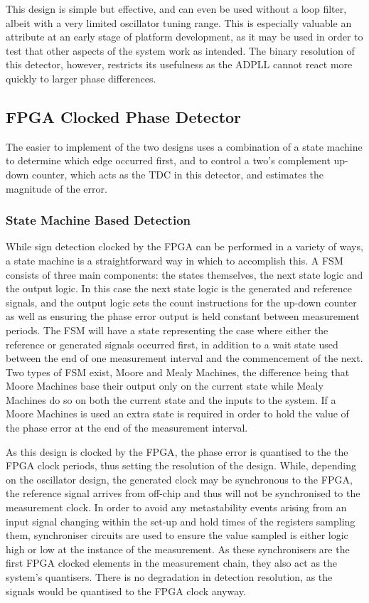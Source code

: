 This design is simple but effective, and can even be used without a loop filter, albeit with a very limited oscillator tuning range. This is especially valuable an attribute at an early stage of platform development, as it may be used in order to test that other aspects of the system work as intended. The binary resolution of this detector, however, restricts its usefulness as the \ac{ADPLL} cannot react more quickly to larger phase differences.

\subsection{\acs{FPGA} Clocked Phase Detector}
The easier to implement of the two designs uses a combination of a state machine to determine which edge occurred first, and to control a two's complement up-down counter, which acts as the \ac{TDC} in this detector, and estimates the magnitude of the error.

\subsubsection{State Machine Based Detection}
While sign detection clocked by the \ac{FPGA} can be performed in a variety of ways, a state machine is a straightforward way in which to accomplish this. A \acl{FSM} consists of three main components: the states themselves, the next state logic and the output logic. In this case the next state logic is the generated and reference signals, and the output logic sets the count instructions for the up-down counter as well as ensuring the phase error output is held constant between measurement periods. The \ac{FSM} will have a state representing the case where either the reference or generated signals occurred first, in addition to a wait state used between the end of one measurement interval and the commencement of the next. Two types of \ac{FSM} exist, Moore and Mealy Machines, the difference being that Moore Machines base their output only on the current state while Mealy Machines do so on both the current state and the inputs to the system. If a Moore Machines is used an extra state is required in order to hold the value of the phase error at the end of the measurement interval.

As this design is clocked by the \ac{FPGA}, the phase error is quantised to the the \ac{FPGA} clock periods, thus setting the resolution of the design. While, depending on the oscillator design, the generated clock may be synchronous to the \ac{FPGA}, the reference signal arrives from off-chip and thus will not be synchronised to the measurement clock. In order to avoid any metastability events arising from an input signal changing within the set-up and hold times of the registers sampling them, synchroniser circuits are used to ensure the value sampled is either logic high or low at the instance of the measurement. As these synchronisers are the first \ac{FPGA} clocked elements in the measurement chain, they also act as the system's quantisers. There is no degradation in detection resolution, as the signals would be quantised to the \ac{FPGA} clock anyway.

